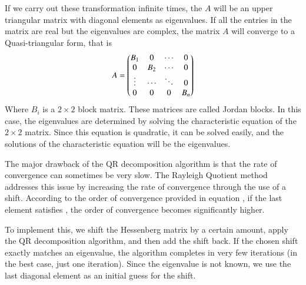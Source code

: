 \documentclass[journal]{IEEEtran}
\begin{document}
If we carry out these transformation infinite times, the $A$ will be an upper triangular matrix with diagonal elements as eigenvalues.
If all the entries in the matrix are real but the eigenvalues are complex, the matrix $A$ will converge to a Quasi-triangular form, that is
\begin{align}
	A = \begin{pmatrix}B_1 & 0 & \cdots & 0 \\
		   0 & B_2 & \cdots & 0\\
		   \vdots & \cdots & \ddots & 0\\
		   0 & 0 & 0 & B_n\end{pmatrix}
\end{align}
Where $B_i$ is a $2 \times 2$ block matrix. These matrices are called Jordan blocks. In this case, the eigenvalues are determined by solving the characteristic equation of the $2 \times 2$ matrix. Since this equation is quadratic, it can be solved easily, and the solutions of the characteristic equation will be the eigenvalues.

The major drawback of the QR decomposition algorithm is that the rate of convergence can sometimes be very slow. The Rayleigh Quotient method addresses this issue by increasing the rate of convergence through the use of a shift. According to the order of convergence provided in equation , if the last element satisfies , the order of convergence becomes significantly higher. 

To implement this, we shift the Hessenberg matrix by a certain amount, apply the QR decomposition algorithm, and then add the shift back. If the chosen shift exactly matches an eigenvalue, the algorithm completes in very few iterations (in the best case, just one iteration). Since the eigenvalue is not known, we use the last diagonal element as an initial guess for the shift.
\end{document}
